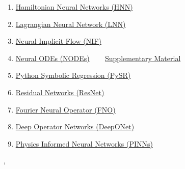 \documentclass[11pt]{article}
\renewcommand{\today}{\shortmonthname[\the\month] \the \day,  \the\year}
\begin{document}
\begin{enumerate}
	\item  \href{https://mp.weixin.qq.com/s/rPDTlcpQhwVKn24GBj-lPw}{Hamiltonian Neural Networks (HNN)} %
	\item  \href{https://mp.weixin.qq.com/s/Qm_KB7Dt-LFNABctATuOlg}{Lagrangian Neural Network (LNN)} %
	\item  \href{https://mp.weixin.qq.com/s/zIFQfJ2YXiGAYp26u7TVXw}{Neural Implicit Flow (NIF)} %
	\item  \href{https://mp.weixin.qq.com/s/DJ9W3NngqNN69zFavPR7jQ}{Neural ODEs (NODEs)} ~~~  \href{https://mp.weixin.qq.com/s/3okjGSJq5GDRC6cQscSDxw}{Supplementary Material} %
	\item  \href{https://mp.weixin.qq.com/s/48IrFK3okhCm1VEPHHN-gg}{Python Symbolic Regression (PySR)} %
	\item  \href{https://mp.weixin.qq.com/s/csjZ0DS-f3IO93-lQzjzbw}{Residual Networks (ResNet)} %
	\item  \href{https://mp.weixin.qq.com/s/uXlx5kTpXeQd14Zer_Gr4g}{Fourier Neural Operator (FNO)} %
	\item  \href{https://mp.weixin.qq.com/s/FKecs-6h9zoum5WfU97W0gL}{Deep Operator Networks (DeepONet)} %
	\item  \href{https://mp.weixin.qq.com/s/p0ryb-hG9WWqer0oZCjY5A}{Physics Informed Neural Networks (PINNs)} %
\end{enumerate}




%
\begin{flushright}
	\tiny \today 
\end{flushright}
\end{document}
